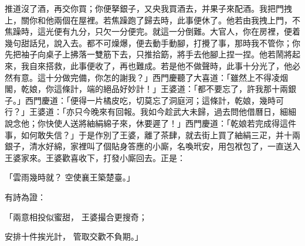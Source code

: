 \begin{showcontents}{}
推道沒了酒，再交你買；你便拏銀子，又央我買酒去，并果子來配酒。我把門拽上，關你和他兩個在屋裡。若焦躁跑了歸去時，此事便休了。他若由我拽上門，不焦躁時，這光便有九分，只欠一分便完。就這一分倒難。大官人，你在房裡，便着幾句甜話兒，說入去。都不可燥爆，便去動手動腳，打攪了事，那時我不管你；你先把袖子向桌子上拂落一雙筋下去，只推拾筯，將手去他腳上捏一捏。他若鬧將起來，我自來搭救，此事便收了，再也難成。若是他不做聲時，此事十分光了，他必然有意。這十分做完備，你怎的謝我？」西門慶聽了大喜道：「雖然上不得凌烟閣，乾娘，你這條計，端的絕品好妙計！」王婆道：「都不要忘了，許我那十兩銀子。」西門慶道：「便得一片橘皮吃，切莫忘了洞庭河；這條計，乾娘，幾時可行？」王婆道：「亦只今晚來有回報。我如今趁武大未歸，過去問他借曆日，細細說念他；你快使人送將紬絹綿子來，休要遲了！」西門慶道：「乾娘若完成得這件事，如何敢失信？」于是作別了王婆，離了茶肆，就去街上買了紬絹三疋，并十兩銀子，清水好綿，家裡叫了個貼身答應的小廝，名喚玳安，用包袱包了，一直送入王婆家來。王婆歡喜收下，打發小廝回去。正是：

「雲雨幾時就？  空使襄王築楚臺。」

有詩為證：

「兩意相投似蜜甜，  王婆撮合更搜奇；

安排十件挨光計，  管取交歡不負期。」


\end{showcontents}
